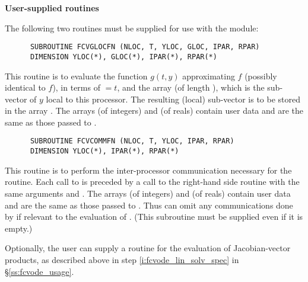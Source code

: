 \begin{Steps}
\item {\bf User-supplied routines}

  The following two routines must be supplied for use with the {\cvbbdpre}
  module:
\begin{verbatim}
      SUBROUTINE FCVGLOCFN (NLOC, T, YLOC, GLOC, IPAR, RPAR)
      DIMENSION YLOC(*), GLOC(*), IPAR(*), RPAR(*)
\end{verbatim}
  This routine is to evaluate the function $g(t,y)$ approximating $f$
  (possibly identical to $f$), in terms of  $ = t$, and the array
   (of length ), which is the sub-vector
  of $y$ local to this processor.  The resulting (local) sub-vector
  is to be stored in the array .
  The arrays  (of integers) and  (of reals) contain user data
  and are the same as those passed to .

\begin{verbatim}
      SUBROUTINE FCVCOMMFN (NLOC, T, YLOC, IPAR, RPAR)
      DIMENSION YLOC(*), IPAR(*), RPAR(*)
\end{verbatim}
  This routine is to perform the inter-processor communication necessary
  for the  routine.
  Each call to  is preceded by a call to the right-hand side
  routine  with the same arguments  and .
  The arrays  (of integers) and  (of reals) contain user data
  and are the same as those passed to .
  Thus  can omit any communications done by  if
  relevant to the evaluation of .
  (This subroutine must be supplied even if it is empty.)

  Optionally, the user can supply a routine  for the evaluation of
  Jacobian-vector products, as described above in step \ref{i:fcvode_lin_solv_spec}
  in \S\ref{ss:fcvode_usage}.

\end{Steps}

